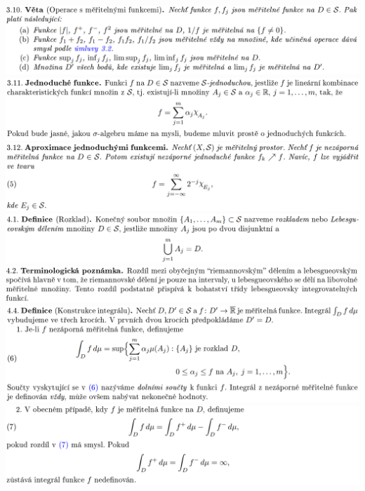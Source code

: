 \documentclass[12pt,a4paper]{article}
\begin{document}
\begin{center}
		\includegraphics[width=\textwidth]{img/1lebInt/2020-06-20 17 53 15.png}\vspace{0.3cm}
		\includegraphics[width=\textwidth]{img/1lebInt/2020-06-20 17 53 26.png}\vspace{0.3cm}
		\includegraphics[width=\textwidth]{img/1lebInt/2020-06-20 17 53 37.png}\vspace{0.3cm}
		\includegraphics[width=\textwidth]{img/1lebInt/2020-06-20 17 53 50.png}\vspace{0.3cm}
		\includegraphics[width=\textwidth]{img/1lebInt/2020-06-20 17 54 02.png}\vspace{0.3cm}
		\includegraphics[width=\textwidth]{img/1lebInt/2020-06-20 17 54 33.png}\vspace{0.3cm}
		\includegraphics[width=\textwidth]{img/1lebInt/2020-06-20 17 54 47.png}\vspace{0.3cm}

\end{center}
\end{document}
